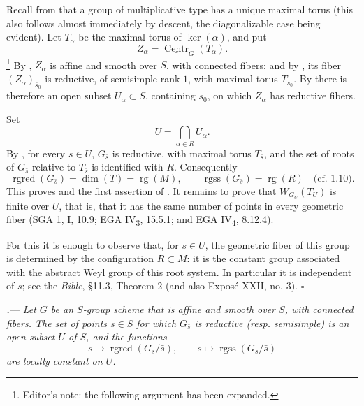 Recall from  that a group of multiplicative type has a
unique maximal torus (this also follows almost immediately by descent,
the diagonalizable case being evident).  Let \(T_\alpha\) be the
maximal torus of \(\ker(\alpha)\), and put
\[
  Z_\alpha=\underline{\operatorname{Centr}}_G(T_\alpha).
\]
\footnote{Editor's note: the following argument has been expanded.}
By , \(Z_\alpha\) is affine and smooth over \(S\), with connected
fibers; and by , its fiber
\((Z_\alpha)_{\bar s_0}\) is reductive, of semisimple rank \(1\), with
maximal torus \(T_{\bar s_0}\).  By  there is therefore an open
subset \(U_\alpha\subset S\), containing \(s_0\), on which
\(Z_\alpha\) has reductive fibers.

Set
\[
  U=\bigcap_{\alpha\in R}U_\alpha.
\]
By , for every \(s\in U\), \(G_{\bar s}\) is reductive, with
maximal torus \(T_{\bar s}\), and the set of roots of \(G_{\bar s}\)
relative to \(T_{\bar s}\) is identified with \(R\).  Consequently
\[
  \operatorname{rgred}(G_{\bar s})
  =
  \dim(T)
  =
  \operatorname{rg}(M),
  \qquad
  \operatorname{rgss}(G_{\bar s})
  =
  \operatorname{rg}(R)
  \quad\text{(cf. 1.10).}
\]
This proves \textup{} and the first assertion of \textup{}.
It remains to prove that \(W_{G_U}(T_U)\) is finite over \(U\), that
is, that it has the same number of points in every geometric fiber
(SGA 1, I, 10.9; EGA IV\textsubscript{3}, 15.5.1; and
EGA IV\textsubscript{4}, 8.12.4).

For this it is enough to observe that, for \(s\in U\), the geometric
fiber of this group is determined by the configuration \(R\subset M\):
it is the constant group associated with the abstract Weyl group of
this root system.  In particular it is independent of \(s\); see the
\emph{Bible}, §11.3, Theorem 2 (and also Exposé XXII, no. 3).
\hfill\(\square\)



\par\medskip\noindent
\textbf{\textit{.}}---
\textit{Let \(G\) be an \(S\)-group scheme that is affine and smooth
over \(S\), with connected fibers.  The set of points \(s\in S\) for
which \(G_{\bar s}\) is reductive \textup{(resp. semisimple)} is an
open subset \(U\) of \(S\), and the functions}
\[
  s\longmapsto\operatorname{rgred}(G_{\bar s}/\bar s),
  \qquad
  s\longmapsto\operatorname{rgss}(G_{\bar s}/\bar s)
\]
\textit{are locally constant on \(U\).}

